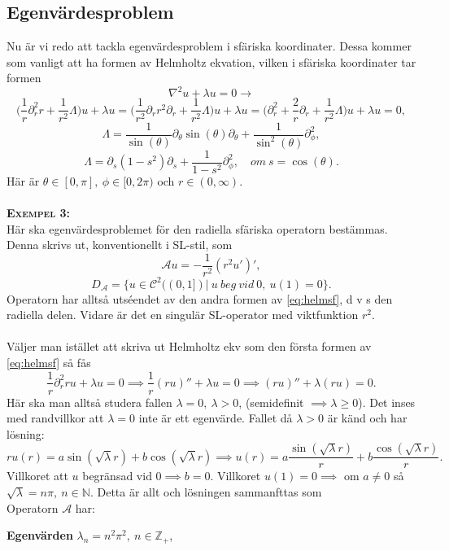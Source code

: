 \documentclass{article}
\begin{document}
\subsection{Egenvärdesproblem}
Nu är vi redo att tackla egenvärdesproblem i sfäriska koordinater. Dessa kommer som vanligt att ha formen av Helmholtz ekvation, vilken i sfäriska koordinater tar formen
$$
\nabla^2u+\lambda u=0\longrightarrow
$$
\begin{equation}\label{eq:helmsf}
    \Big(\frac{1}{r}\partial_r^2r+\frac{1}{r^2}\Lambda\Big)u+\lambda u= \Big(\frac{1}{r^2}\partial_rr^2\partial_r+\frac{1}{r^2}\Lambda\Big)u+\lambda u=\Big(\partial_r^2+\frac{2}{r}\partial_r+\frac{1}{r^2}\Lambda\Big)u+\lambda u=0,
\end{equation}
$$
\Lambda=\frac{1}{\sin(\theta)}\partial_{\theta}\sin(\theta)\partial_{\theta}+\frac{1}{\sin^2(\theta)}\partial_{\phi}^2,
$$
$$
\Lambda=\partial_s(1-s^2)\partial_s+\frac{1}{1-s^2}\partial_{\phi}^2, \quad om \ s=\cos(\theta).
$$
Här är $\theta\in[0,\pi], \ \phi\in[0,2\pi)$ och $r\in(0,\infty)$.\\ \\
\textbf{\textsc{Exempel 3:}}\\
Här ska egenvärdesproblemet för den radiella sfäriska operatorn bestämmas. Denna skrivs ut, konventionellt i SL-stil, som
$$
\mathcal{A}u=-\frac{1}{r^2}(r^2u')',
$$
$$
D_{\mathcal{A}}=\{u\in\mathcal{C}^2((0,1])| \  u \  beg \  vid \ 0, \ u(1)=0\}. 
$$
Operatorn har alltså utséendet av den andra formen av \eqref{eq:helmsf}, d v s den radiella delen. Vidare är det en singulär SL-operator med viktfunktion $r^2$.\\ \\
Väljer man istället att skriva ut Helmholtz ekv som den första formen av \eqref{eq:helmsf} så fås
$$
\frac{1}{r}\partial_r^2ru+\lambda u=0 \implies \frac{1}{r}(ru)''+\lambda u=0 \implies (ru)''+\lambda(ru)=0.
$$
Här ska man alltså studera fallen $\lambda=0, \ \lambda>0$, (semidefinit $\implies \lambda\geq 0$). Det inses med randvillkor att $\lambda=0$ inte är ett egenvärde. Fallet då $\lambda>0$ är känd och har lösning:
$$
ru(r)=a\sin(\sqrt{\lambda}r)+b\cos(\sqrt{\lambda}r) \implies u(r)=a\frac{\sin(\sqrt{\lambda}r)}{r}+b\frac{\cos(\sqrt{\lambda}r)}{r}.
$$
Villkoret att $u$ begränsad vid $0\implies b=0$. Villkoret $u(1)=0\implies$ om $a\neq0$ så $\sqrt{\lambda}=n\pi, \ n\in\mathbb{N}$. Detta är allt och lösningen sammanfttas som\\
Operatorn $\mathcal{A}$ har:

\textbf{Egenvärden} $\lambda_n=n^2\pi^2, \ n\in\mathbb{Z}_+$,
\end{document}
